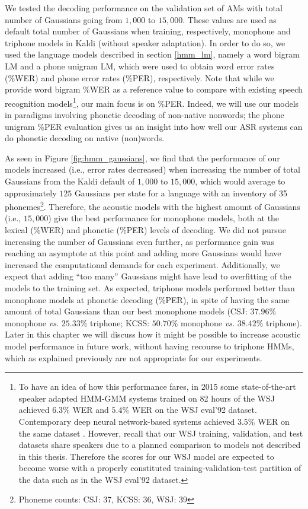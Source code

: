 We tested the decoding performance on the validation set of AMs with total number of Gaussians going from $1,000$ to $15,000$. These values are used as default total number of Gaussians when training, respectively, monophone and triphone models in Kaldi (without speaker adaptation).
In order to do so, we used the language models described in section \ref{hmm_lm}, namely a word bigram LM and a phone unigram LM, which were used to obtain word error rates (\%WER) and phone error rates (\%PER), respectively. Note that while we provide word bigram \%WER as a reference value to compare with existing speech recognition models\footnote{To have an idea of how this performance fares, in 2015 some state-of-the-art speaker adapted HMM-GMM systems trained on 82 hours of the WSJ achieved $6.3\%$ WER \cite{panayotov2015} and $5.4\%$ WER \cite{chan2015} on the WSJ eval'92 dataset. Contemporary deep neural network-based systems achieved $3.5\%$ WER on the same dataset \cite{chan2015}. However, recall that our WSJ training, validation, and test datasets share speakers due to a planned comparison to models not described in this thesis. Therefore the scores for our WSJ model are expected to become worse with a properly constituted training-validation-test partition of the data such as in the WSJ eval'92 dataset.}, our main focus is on \%PER. Indeed, we will use our models in paradigms involving phonetic decoding of non-native nonwords; the phone unigram \%PER evaluation gives us an insight into how well our ASR systems can do phonetic decoding on native (non)words. 

As seen in Figure \ref{fig:hmm_gaussians}, we find that the performance of our models increased (i.e., error rates decreased) when increasing the number of total Gaussians from the Kaldi default of $1,000$ to $15,000$, which would average to approximately $125$ Gaussians per state for a language with an inventory of 35 phonemes\footnote{Phoneme counts: CSJ: 37, KCSS: 36, WSJ: 39}.   
Therefore, the acoustic models with the highest amount of Gaussians (i.e., $15,000$) give the best performance for monophone models, both at the lexical (\%WER) and phonetic (\%PER) levels of decoding.
We did not pursue increasing the number of Gaussians even further, as performance gain was reaching an asymptote at this point and adding more Gaussians would have increased the computational demands for each experiment. Additionally, we expect that adding ``too many'' Gaussians might have lead to overfitting of the models to the training set.
As expected, triphone models performed better than monophone models at phonetic decoding (\%PER), in spite of having the same amount of total Gaussians than our best monophone models (CSJ: $37.96\%$ monophone \textit{vs.} $25.33\%$ triphone; KCSS: $50.70\%$ monophone \textit{vs.} $38.42\%$ triphone). Later in this chapter we will discuss how it might be possible to increase acoustic model performance in future work, without having recourse to triphone HMMs, which as explained previously are not appropriate for our experiments.  

